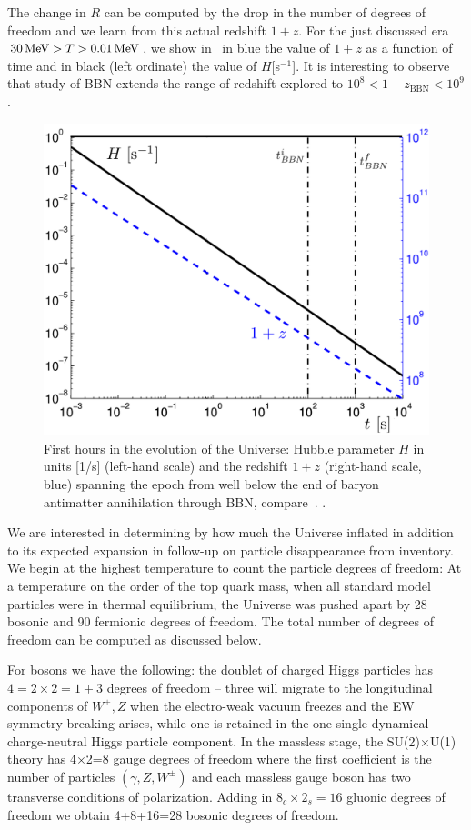 The change in $R$ can be computed by the drop in the number of degrees of freedom and we learn from this actual redshift $1+z$. For the just discussed era $30\text{\,MeV}>T>0.01\text{\,MeV}$, we show in~ in blue the value of $1+z$ as a function of time and in black (left ordinate) the value of $H$[s$^{-1}$]. It is interesting to observe that study of BBN extends the range of redshift explored to $10^8<1+z_\mathrm{BBN}<10^9$.

\begin{figure}
\centerline{\includegraphics[width=0.60\linewidth]{plots/HzBBN.png}} 
\caption{First hours in the evolution of the Universe: Hubble parameter $H$ in units [1/s] (left-hand scale) and the redshift $1+z$ (right-hand scale, blue) spanning the epoch from well below the end of baryon antimatter annihilation through BBN, compare~. . } \label{fig:BBN1}
\end{figure}

We are interested in determining by how much the Universe inflated in addition to its expected expansion in follow-up on particle disappearance from inventory. We begin at the highest temperature to count the particle degrees of freedom: At a temperature on the order of the top quark mass, when all standard model particles were in thermal equilibrium, the Universe was pushed apart by 28 bosonic and 90 fermionic degrees of freedom. The total number of degrees of freedom can be computed as discussed below. 

For bosons we have the following: the doublet of charged Higgs particles has $4=2\times2=1+3$ degrees of freedom -- three will migrate to the longitudinal components of $W^\pm, Z$ when the electro-weak vacuum freezes and the EW symmetry breaking arises, while one is retained in the one single dynamical charge-neutral Higgs particle component. In the massless stage, the SU(2)$\times$U(1) theory has 4$\times$2=8 gauge degrees of freedom where the first coefficient is the number of particles $(\gamma, Z, W^\pm)$ and each massless gauge boson has two transverse conditions of polarization. Adding in $8_c\times2_s=16$ gluonic degrees of freedom we obtain 4+8+16=28 bosonic degrees of freedom. 

